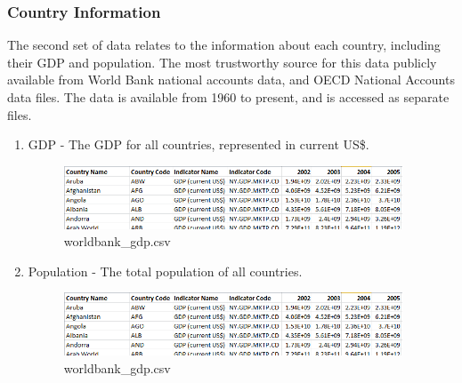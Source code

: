 \documentclass[a4 paper, 12pt]{article}
\begin{document}
    \subsubsection{Country Information}
    The second set of data relates to the information about each country, including their GDP and population. The most trustworthy source for this data publicly available from World Bank national accounts data, and OECD National Accounts data files. The data is available from 1960 to present, and is accessed as separate files. 
        \begin{enumerate}
            \item GDP - The GDP for all countries, represented in current US\$.
                \begin{figure} [H]
                    \centering
                    \includegraphics[width=0.95\textwidth, frame]
                        {./images/data/worldbank_gdp.png}
                        \caption{worldbank\_gdp.csv}                    
                \end{figure}
            \item Population - The total population of all countries.
                \begin{figure} [H]
                    \centering
                    \includegraphics[width=0.95\textwidth, frame]
                        {./images/data/worldbank_gdp.png}      
                        \caption{worldbank\_gdp.csv} 
                \end{figure} 
        \end{enumerate}
\end{document}
